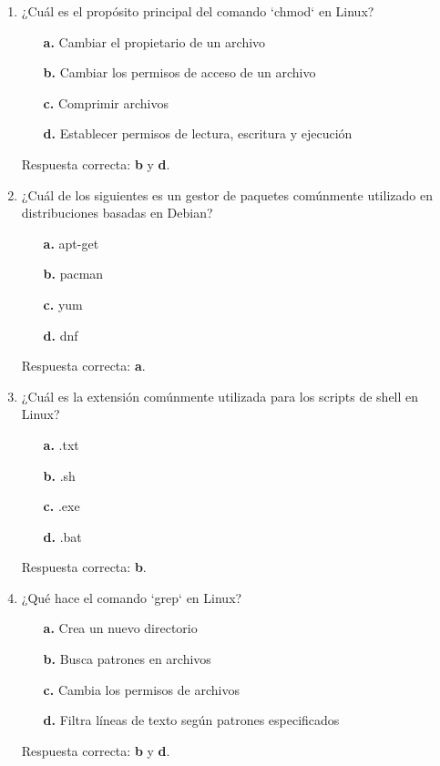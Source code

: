 \documentclass[11pt,twoside]{book}
\begin{document}
\begin{enumerate}
    \item ¿Cuál es el propósito principal del comando `chmod` en Linux?
    \begin{itemize}
        \item[\textbf{a.}] Cambiar el propietario de un archivo
        \item[\textbf{b.}] Cambiar los permisos de acceso de un archivo
        \item[\textbf{c.}] Comprimir archivos
        \item[\textbf{d.}] Establecer permisos de lectura, escritura y ejecución
    \end{itemize}
    Respuesta correcta: \textbf{b} y \textbf{d}.

    \item ¿Cuál de los siguientes es un gestor de paquetes comúnmente utilizado en distribuciones basadas en Debian?
    \begin{itemize}
        \item[\textbf{a.}] apt-get
        \item[\textbf{b.}] pacman
        \item[\textbf{c.}] yum
        \item[\textbf{d.}] dnf
    \end{itemize}
    Respuesta correcta: \textbf{a}.

    \item ¿Cuál es la extensión comúnmente utilizada para los scripts de shell en Linux?
    \begin{itemize}
        \item[\textbf{a.}] .txt
        \item[\textbf{b.}] .sh
        \item[\textbf{c.}] .exe
        \item[\textbf{d.}] .bat
    \end{itemize}
    Respuesta correcta: \textbf{b}.

    \item ¿Qué hace el comando `grep` en Linux?
    \begin{itemize}
        \item[\textbf{a.}] Crea un nuevo directorio
        \item[\textbf{b.}] Busca patrones en archivos
        \item[\textbf{c.}] Cambia los permisos de archivos
        \item[\textbf{d.}] Filtra líneas de texto según patrones especificados
    \end{itemize}
    Respuesta correcta: \textbf{b} y \textbf{d}.


\end{enumerate}
\end{document}
